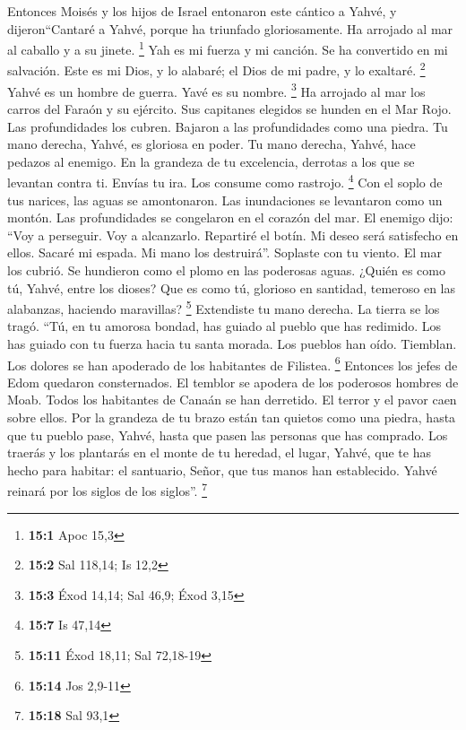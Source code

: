  Entonces Moisés y los hijos de Israel entonaron este
cántico a Yahvé, y dijeron``Cantaré a Yahvé, porque ha triunfado
gloriosamente. Ha arrojado al mar al caballo y a su jinete. \footnote{\textbf{15:1}
  Apoc 15,3}  Yah es mi fuerza y mi canción. Se ha
convertido en mi salvación. Este es mi Dios, y lo alabaré; el Dios de mi
padre, y lo exaltaré. \footnote{\textbf{15:2} Sal 118,14; Is 12,2}
 Yahvé es un hombre de guerra. Yavé es su nombre.
\footnote{\textbf{15:3} Éxod 14,14; Sal 46,9; Éxod 3,15} 
Ha arrojado al mar los carros del Faraón y su ejército. Sus capitanes
elegidos se hunden en el Mar Rojo.  Las profundidades los
cubren. Bajaron a las profundidades como una piedra.  Tu
mano derecha, Yahvé, es gloriosa en poder. Tu mano derecha, Yahvé, hace
pedazos al enemigo.  En la grandeza de tu excelencia,
derrotas a los que se levantan contra ti. Envías tu ira. Los consume
como rastrojo. \footnote{\textbf{15:7} Is 47,14}  Con el
soplo de tus narices, las aguas se amontonaron. Las inundaciones se
levantaron como un montón. Las profundidades se congelaron en el corazón
del mar.  El enemigo dijo: ``Voy a perseguir. Voy a
alcanzarlo. Repartiré el botín. Mi deseo será satisfecho en ellos.
Sacaré mi espada. Mi mano los destruirá''.  Soplaste con
tu viento. El mar los cubrió. Se hundieron como el plomo en las
poderosas aguas.  ¿Quién es como tú, Yahvé, entre los
dioses? Que es como tú, glorioso en santidad, temeroso en las alabanzas,
haciendo maravillas? \footnote{\textbf{15:11} Éxod 18,11; Sal 72,18-19}
 Extendiste tu mano derecha. La tierra se los tragó.
 ``Tú, en tu amorosa bondad, has guiado al pueblo que has
redimido. Los has guiado con tu fuerza hacia tu santa morada.
 Los pueblos han oído. Tiemblan. Los dolores se han
apoderado de los habitantes de Filistea. \footnote{\textbf{15:14} Jos
  2,9-11}  Entonces los jefes de Edom quedaron
consternados. El temblor se apodera de los poderosos hombres de Moab.
Todos los habitantes de Canaán se han derretido.  El
terror y el pavor caen sobre ellos. Por la grandeza de tu brazo están
tan quietos como una piedra, hasta que tu pueblo pase, Yahvé, hasta que
pasen las personas que has comprado.  Los traerás y los
plantarás en el monte de tu heredad, el lugar, Yahvé, que te has hecho
para habitar: el santuario, Señor, que tus manos han establecido.
 Yahvé reinará por los siglos de los siglos''.
\footnote{\textbf{15:18} Sal 93,1}

